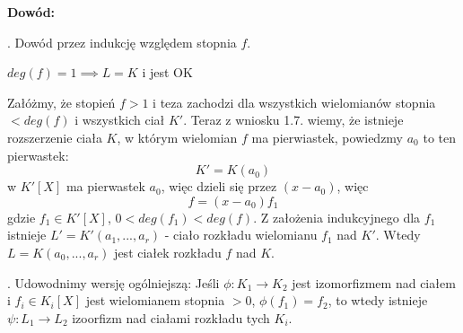 \textbf{Dowód:}

. Dowód przez indukcję względem stopnia $f$.

$deg(f)=1\implies L=K$ i jest OK

Załóżmy, że stopień $f>1$ i teza zachodzi dla wszystkich wielomianów stopnia $<deg(f)$ i wszystkich ciał $K'$. Teraz z wniosku 1.7. wiemy, że istnieje rozszerzenie ciała $K$, w którym wielomian $f$ ma pierwiastek, powiedzmy $a_0$ to ten pierwastek:
$$K'=K(a_0)$$
w $K'[X]$ ma pierwastek $a_0$, więc dzieli się przez $(x-a_0)$, więc
$$f=(x-a_0)f_1$$
gdzie $f_1\in K'[X]$, $0<deg(f_1)<deg(f)$. Z założenia indukcyjnego dla $f_1$ istnieje $L'=K'(a_1,..., a_r)$ - ciało rozkładu wielomianu $f_1$ nad $K'$. Wtedy $L=K(a_0,...,a_r)$ jest ciałek rozkładu $f$ nad $K$.

. Udowodnimy wersję ogólniejszą: Jeśli $\phi:K_1\to K_2$ jest izomorfizmem nad ciałem i $f_i\in K_i[X]$ jest wielomianem stopnia $>0$, $\phi(f_1)=f_2$, to wtedy istnieje $\psi:L_1\to L_2$ izoorfizm nad ciałami rozkładu tych $K_i$. 